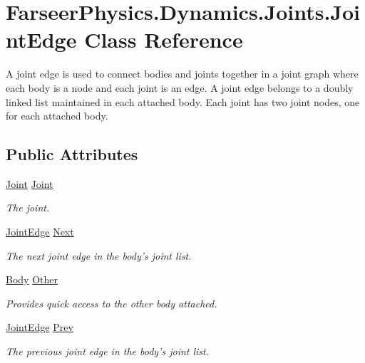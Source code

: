 \hypertarget{class_farseer_physics_1_1_dynamics_1_1_joints_1_1_joint_edge}{\section{Farseer\+Physics.\+Dynamics.\+Joints.\+Joint\+Edge Class Reference}
\label{class_farseer_physics_1_1_dynamics_1_1_joints_1_1_joint_edge}
}


A joint edge is used to connect bodies and joints together in a joint graph where each body is a node and each joint is an edge. A joint edge belongs to a doubly linked list maintained in each attached body. Each joint has two joint nodes, one for each attached body.  


\subsection*{Public Attributes}
\begin{DoxyCompactItemize}
\item 
\hyperlink{class_farseer_physics_1_1_dynamics_1_1_joints_1_1_joint}{Joint} \hyperlink{class_farseer_physics_1_1_dynamics_1_1_joints_1_1_joint_edge_af270df3c8097125c304de6bcf5227784}{Joint}
\begin{DoxyCompactList}\small\item\em The joint. \end{DoxyCompactList}\item 
\hyperlink{class_farseer_physics_1_1_dynamics_1_1_joints_1_1_joint_edge}{Joint\+Edge} \hyperlink{class_farseer_physics_1_1_dynamics_1_1_joints_1_1_joint_edge_aaab10255c100f9c03dfcfde1d0efa0cd}{Next}
\begin{DoxyCompactList}\small\item\em The next joint edge in the body's joint list. \end{DoxyCompactList}\item 
\hyperlink{class_farseer_physics_1_1_dynamics_1_1_body}{Body} \hyperlink{class_farseer_physics_1_1_dynamics_1_1_joints_1_1_joint_edge_a1138595512587173c57a22966781bd77}{Other}
\begin{DoxyCompactList}\small\item\em Provides quick access to the other body attached. \end{DoxyCompactList}\item 
\hyperlink{class_farseer_physics_1_1_dynamics_1_1_joints_1_1_joint_edge}{Joint\+Edge} \hyperlink{class_farseer_physics_1_1_dynamics_1_1_joints_1_1_joint_edge_a35a8d7b32066201b879b0d8d5a61af9b}{Prev}
\begin{DoxyCompactList}\small\item\em The previous joint edge in the body's joint list. \end{DoxyCompactList}\end{DoxyCompactItemize}


